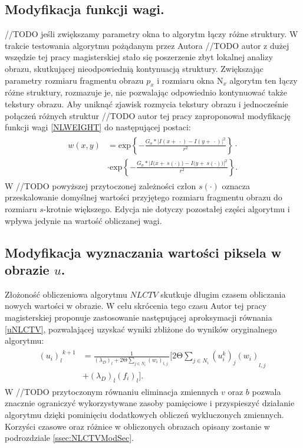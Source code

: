 \documentclass[12pt, twoside, openany]{report}
\theoremstyle{definition}
\begin{document}
\subsection{Modyfikacja funkcji wagi.}
//TODO jeśli zwiększamy parametry okna to algorytm łączy różne struktury.
W trakcie testowania algorytmu pożądanym przez Autora //TODO autor z dużej wszędzie tej pracy magisterskiej stało się poszerzenie zbyt lokalnej analizy obrazu, skutkującej nieodpowiednią kontynuacją struktury. Zwiększając parametry rozmiaru fragmentu obrazu $p_x$ i rozmiaru okna $\text{N}_x$ algorytm ten łączy różne struktury, rozmazuje je, nie pozwalając odpowiednio kontynuować także tekstury obrazu. Aby uniknąć zjawisk rozmycia tekstury obrazu i jednocześnie połączeń różnych struktur //TODO autor tej pracy zaproponował modyfikację funkcji wagi \eqref{NLWEIGHT} do następującej postaci:
\begin{align}
\begin{aligned}
w\left(x,y\right) &= {\mathrm{exp} \left\{-\frac{G_{\sigma }*{\big|I\left(x+\ \cdot \right)-I\left(y+\ \cdot \right)\big|}^2}{r^2}\right\} \cdot}\\
&\cdot {\mathrm{exp} \left\{-\frac{G_{\sigma }*{\Big|I\big(x+\ s(\cdot) \big)-I\big(y+\ s(\cdot) \big)\Big|}^2}{r^2}\right\} }.
\label{NLWEIGHTMODIFIED}
\end{aligned}
\end{align}
W //TODO powyższej przytoczonej zależności człon $s(\cdot)$ oznacza przeskalowanie  domyślnej wartości przyjętego rozmiaru fragmentu obrazu do rozmiaru $s$-krotnie większego. Edycja nie dotyczy pozostałej części  algorytmu i wpływa jedynie na wartość obliczanej wagi.
\subsection{Modyfikacja wyznaczania wartości piksela w obrazie $u$.}
Złożoność obliczeniowa algorytmu $NLCTV$ skutkuje długim czasem obliczania nowych wartości w obrazie. W celu skrócenia tego czasu Autor tej pracy magisterskiej proponuje zastosowanie następującej aproksymacji równania \eqref{uNLCTV}, pozwalającej uzyskać wyniki zbliżone do wyników oryginalnego algorytmu:
\begin{align}
\begin{aligned}
{{\left(u_i\right)}_l}^{k+1} &= \frac{1}{{\left({\lambda }_D\right)}_l+2\mathrm{\Theta} \sum\limits_{j\in N_i} {\left(w_i\right)}_{l,j}\ } \Biggl[2\mathrm{\Theta }\sum_{j\in N_i} {{{\left(u^k_i\right)}_j\left(w_i\right)}_{l,j}\ }\\
&+ {\left({\lambda }_D\right)}_l{\left(f_i\right)}_l\Biggr].
\end{aligned}
\label{NLH1}
\end{align}
W //TODO przytoczonym równaniu eliminacja zmiennych $v$ oraz $b$ pozwala znacznie ograniczyć wykorzystywane zasoby pamięciowe i przyspieszyć działanie algorytmu dzięki pominięciu dodatkowych obliczeń wykluczonych zmiennych. Korzyści czasowe oraz różnice w obliczonych obrazach opisany zostanie w podrozdziale \ref{ssec:NLCTVModSec}.
\end{document}
